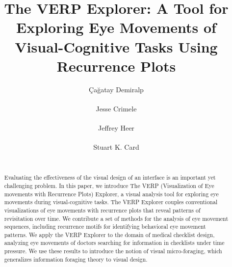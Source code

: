 \documentclass{sigchi}
\begin{document}
\title{The VERP Explorer: A Tool for Exploring Eye Movements of
Visual-Cognitive Tasks Using Recurrence Plots}

 \author{ 
	\alignauthor \c{C}a\u{g}atay Demiralp \\
	\\
	\alignauthor Jesse Crimele\\
	 \\
	\alignauthor Jeffrey Heer\\
	\\ 
	\alignauthor Stuart K. Card \\ 
	 \\
}

\maketitle

\begin{abstract} Evaluating the effectiveness of the visual design of an
interface is an important yet challenging problem. In this paper, we
introduce The VERP (Visualization of Eye movements with Recurrence Plots)
Explorer, a visual analysis tool for exploring eye movements during
visual-cognitive tasks. The VERP Explorer couples conventional
visualizations of eye movements with recurrence plots that reveal patterns
of revisitation over time. We contribute a set of methods for the analysis
of eye movement sequences, including recurrence motifs for identifying
behavioral eye movement patterns. We apply the VERP Explorer to the domain
of medical checklist design, analyzing eye movements of doctors searching
for information in checklists under time pressure. We use these results to
introduce the notion of visual micro-foraging, which generalizes
information foraging theory to visual design. \end{abstract}



\end{document}
